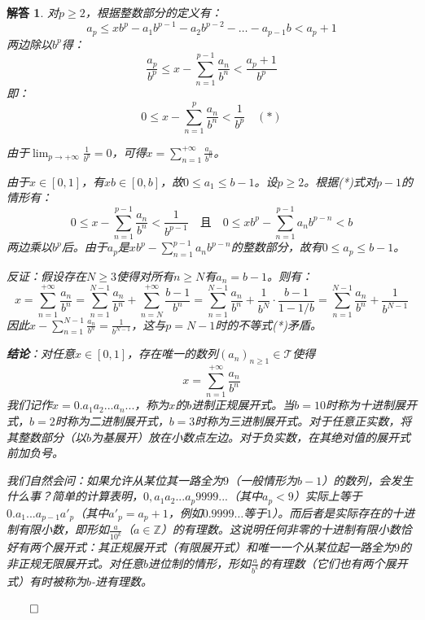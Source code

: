 \documentclass[12pt,UTF8,fontset=none]{ctexbook}
\theoremstyle{exercisestyle}
\theoremstyle{solutionstyle}
\newtheorem*{solution*}{解答}
\newenvironment{solution}
  {\begin{solution*}}
  {\hfill\ensuremath{\qed}\end{solution*}}
\begin{document}
\begin{solution}
对$p \ge 2$，根据整数部分的定义有：
$$a_p \leqslant x b^p - a_1 b^{p-1} - a_2 b^{p-2} - \dots - a_{p-1} b < a_p + 1$$
两边除以$b^p$得：
$$\frac{a_p}{b^p} \leqslant x - \sum_{n=1}^{p-1} \frac{a_n}{b^n} < \frac{a_p+1}{b^p}$$
即：
$$0 \leqslant x - \sum_{n=1}^p \frac{a_n}{b^n} < \frac{1}{b^p} \quad (*)$$

由于$\lim_{p \to +\infty} \frac{1}{b^p} = 0$，可得$x = \sum_{n=1}^{+\infty} \frac{a_n}{b^n}$。

由于$x \in [0,1]$，有$xb \in [0,b]$，故$0 \leq a_1 \leq b-1$。设$p \geq 2$。根据(*)式对$p-1$的情形有：
$$0 \leqslant x - \sum_{n=1}^{p-1} \frac{a_n}{b^n} < \frac{1}{b^{p-1}} \quad \text{且} \quad 0 \leqslant x b^p - \sum_{n=1}^{p-1} a_n b^{p-n} < b$$
两边乘以$b^p$后。由于$a_p$是$xb^p-\sum_{n=1}^{p-1}a_nb^{p-n}$的整数部分，故有$0\leqslant a_p\leqslant b-1$。

反证：假设存在$N \ge 3$使得对所有$n \geq N$有$a_n = b - 1$。则有：
$$x = \sum_{n=1}^{+\infty} \frac{a_n}{b^n} = \sum_{n=1}^{N-1} \frac{a_n}{b^n} + \sum_{n=N}^{+\infty} \frac{b-1}{b^n} = \sum_{n=1}^{N-1} \frac{a_n}{b^n} + \frac{1}{b^N} \cdot \frac{b-1}{1-1/b} = \sum_{n=1}^{N-1} \frac{a_n}{b^n} + \frac{1}{b^{N-1}}$$
因此$x - \sum_{n=1}^{N-1} \frac{a_n}{b^n} = \frac{1}{b^{N-1}}$，这与$p = N-1$时的不等式(*)矛盾。

\textbf{结论}：对任意$x \in [0,1]$，存在唯一的数列$(a_n)_{n \geq 1} \in \mathcal T$使得
$$x = \sum_{n=1}^{+\infty} \frac{a_n}{b^n}$$
我们记作$x = 0.a_1 a_2 ... a_n ...$，称为$x$的$b$进制正规展开式。当$b = 10$时称为十进制展开式，$b = 2$时称为二进制展开式，$b = 3$时称为三进制展开式。对于任意正实数，将其整数部分（以$b$为基展开）放在小数点左边。对于负实数，在其绝对值的展开式前加负号。

我们自然会问：如果允许从某位其一路全为$9$（一般情形为$b-1$）的数列，会发生什么事？简单的计算表明，$0, a_1 a_2 ... a_p 9999...$（其中$a_p < 9$）实际上等于$0.a_1 ... a_{p-1} a'_p$（其中$a'_p = a_p + 1$，例如$0.9999\ldots$等于$1$）。而后者是实际存在的十进制有限小数，即形如$\frac{a}{10^k}$（$a \in \mathbb{Z}$）的有理数。这说明任何非零的十进制有限小数恰好有两个展开式：其正规展开式（有限展开式）和唯一一个从某位起一路全为$9$的非正规无限展开式。对任意$b$进位制的情形，形如$\frac{a}{b^k}$的有理数（它们也有两个展开式）有时被称为$b$-进有理数。

\end{solution}
\end{document}
